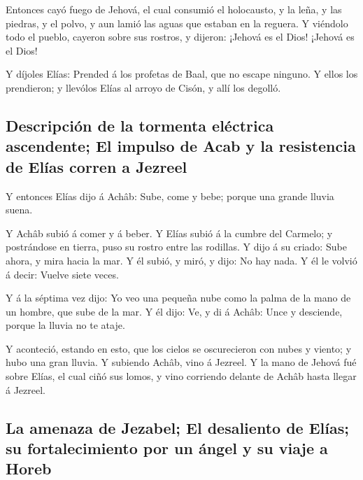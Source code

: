  Entonces cayó fuego de Jehová, el cual consumió el
holocausto, y la leña, y las piedras, y el polvo, y aun lamió las aguas
que estaban en la reguera.  Y viéndolo todo el pueblo,
cayeron sobre sus rostros, y dijeron: ¡Jehová es el Dios! ¡Jehová es el
Dios!

 Y díjoles Elías: Prended á los profetas de Baal, que no
escape ninguno. Y ellos los prendieron; y llevólos Elías al arroyo de
Cisón, y allí los degolló.

\hypertarget{descripciuxf3n-de-la-tormenta-eluxe9ctrica-ascendente-el-impulso-de-acab-y-la-resistencia-de-eluxedas-corren-a-jezreel}{%
\subsection{Descripción de la tormenta eléctrica ascendente; El impulso
de Acab y la resistencia de Elías corren a
Jezreel}\label{descripciuxf3n-de-la-tormenta-eluxe9ctrica-ascendente-el-impulso-de-acab-y-la-resistencia-de-eluxedas-corren-a-jezreel}}

 Y entonces Elías dijo á Achâb: Sube, come y bebe; porque
una grande lluvia suena.

 Y Achâb subió á comer y á beber. Y Elías subió á la
cumbre del Carmelo; y postrándose en tierra, puso su rostro entre las
rodillas.  Y dijo á su criado: Sube ahora, y mira hacia
la mar. Y él subió, y miró, y dijo: No hay nada. Y él le volvió á decir:
Vuelve siete veces.

 Y á la séptima vez dijo: Yo veo una pequeña nube como la
palma de la mano de un hombre, que sube de la mar. Y él dijo: Ve, y di á
Achâb: Unce y desciende, porque la lluvia no te ataje.

 Y aconteció, estando en esto, que los cielos se
oscurecieron con nubes y viento; y hubo una gran lluvia. Y subiendo
Achâb, vino á Jezreel.  Y la mano de Jehová fué sobre
Elías, el cual ciñó sus lomos, y vino corriendo delante de Achâb hasta
llegar á Jezreel.

\hypertarget{la-amenaza-de-jezabel-el-desaliento-de-eluxedas-su-fortalecimiento-por-un-uxe1ngel-y-su-viaje-a-horeb}{%
\subsection{La amenaza de Jezabel; El desaliento de Elías; su
fortalecimiento por un ángel y su viaje a
Horeb}\label{la-amenaza-de-jezabel-el-desaliento-de-eluxedas-su-fortalecimiento-por-un-uxe1ngel-y-su-viaje-a-horeb}}

